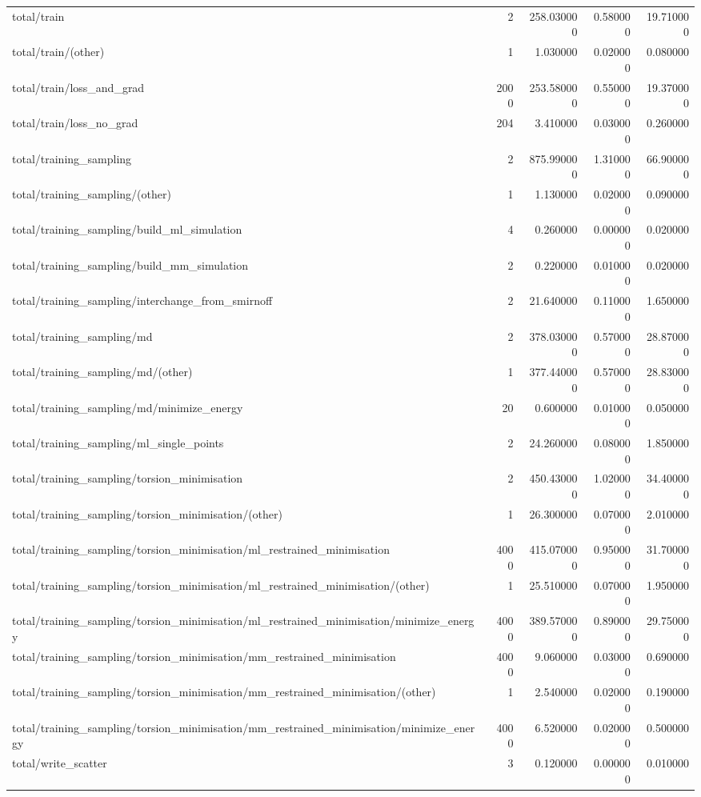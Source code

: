 \begin{tabular}{lrrrr}
total/train & 2 & 258.030000 & 0.580000 & 19.710000 \\
total/train/(other) & 1 & 1.030000 & 0.020000 & 0.080000 \\
total/train/loss_and_grad & 2000 & 253.580000 & 0.550000 & 19.370000 \\
total/train/loss_no_grad & 204 & 3.410000 & 0.030000 & 0.260000 \\
total/training_sampling & 2 & 875.990000 & 1.310000 & 66.900000 \\
total/training_sampling/(other) & 1 & 1.130000 & 0.020000 & 0.090000 \\
total/training_sampling/build_ml_simulation & 4 & 0.260000 & 0.000000 & 0.020000 \\
total/training_sampling/build_mm_simulation & 2 & 0.220000 & 0.010000 & 0.020000 \\
total/training_sampling/interchange_from_smirnoff & 2 & 21.640000 & 0.110000 & 1.650000 \\
total/training_sampling/md & 2 & 378.030000 & 0.570000 & 28.870000 \\
total/training_sampling/md/(other) & 1 & 377.440000 & 0.570000 & 28.830000 \\
total/training_sampling/md/minimize_energy & 20 & 0.600000 & 0.010000 & 0.050000 \\
total/training_sampling/ml_single_points & 2 & 24.260000 & 0.080000 & 1.850000 \\
total/training_sampling/torsion_minimisation & 2 & 450.430000 & 1.020000 & 34.400000 \\
total/training_sampling/torsion_minimisation/(other) & 1 & 26.300000 & 0.070000 & 2.010000 \\
total/training_sampling/torsion_minimisation/ml_restrained_minimisation & 4000 & 415.070000 & 0.950000 & 31.700000 \\
total/training_sampling/torsion_minimisation/ml_restrained_minimisation/(other) & 1 & 25.510000 & 0.070000 & 1.950000 \\
total/training_sampling/torsion_minimisation/ml_restrained_minimisation/minimize_energy & 4000 & 389.570000 & 0.890000 & 29.750000 \\
total/training_sampling/torsion_minimisation/mm_restrained_minimisation & 4000 & 9.060000 & 0.030000 & 0.690000 \\
total/training_sampling/torsion_minimisation/mm_restrained_minimisation/(other) & 1 & 2.540000 & 0.020000 & 0.190000 \\
total/training_sampling/torsion_minimisation/mm_restrained_minimisation/minimize_energy & 4000 & 6.520000 & 0.020000 & 0.500000 \\
total/write_scatter & 3 & 0.120000 & 0.000000 & 0.010000 \\
\bottomrule
\end{tabular}
